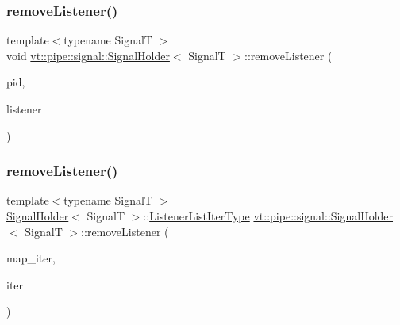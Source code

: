 \subsubsection{\texorpdfstring{remove\+Listener()}{removeListener()}\hspace{0.1cm}{\footnotesize\ttfamily [1/2]}}
{\footnotesize\ttfamily template$<$typename SignalT $>$ \\
void \hyperlink{structvt_1_1pipe_1_1signal_1_1_signal_holder}{vt\+::pipe\+::signal\+::\+Signal\+Holder}$<$ SignalT $>$\+::remove\+Listener (\begin{DoxyParamCaption}\item[{\hyperlink{namespacevt_ac9852acda74d1896f48f406cd72c7bd3}{Pipe\+Type} const \&}]{pid,  }\item[{\hyperlink{structvt_1_1pipe_1_1signal_1_1_signal_holder_a68114d1ad5804c71e014736b18e41e08}{Listener\+Ptr\+Type}}]{listener }\end{DoxyParamCaption})}

\mbox{\label{structvt_1_1pipe_1_1signal_1_1_signal_holder_a08a8e0ba7a1eac7df48561112f5859ab}} 
\subsubsection{\texorpdfstring{remove\+Listener()}{removeListener()}\hspace{0.1cm}{\footnotesize\ttfamily [2/2]}}
{\footnotesize\ttfamily template$<$typename SignalT $>$ \\
\hyperlink{structvt_1_1pipe_1_1signal_1_1_signal_holder}{Signal\+Holder}$<$ SignalT $>$\+::\hyperlink{structvt_1_1pipe_1_1signal_1_1_signal_holder_af0d3ccf4a8700979f414a0485cf41df5}{Listener\+List\+Iter\+Type} \hyperlink{structvt_1_1pipe_1_1signal_1_1_signal_holder}{vt\+::pipe\+::signal\+::\+Signal\+Holder}$<$ SignalT $>$\+::remove\+Listener (\begin{DoxyParamCaption}\item[{\hyperlink{structvt_1_1pipe_1_1signal_1_1_signal_holder_a7f6eed09a10f9b4f679c99ae85983879}{Listener\+Map\+Iter\+Type}}]{map\+\_\+iter,  }\item[{\hyperlink{structvt_1_1pipe_1_1signal_1_1_signal_holder_af0d3ccf4a8700979f414a0485cf41df5}{Listener\+List\+Iter\+Type}}]{iter }\end{DoxyParamCaption})}

